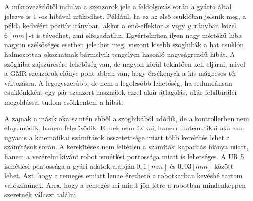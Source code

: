 A mikrovezérlőtől indulva a szenzorok jele a feldolgozás során a gyártó által jelezve is $1^\circ$-os hibával működhet. Például, ha ez az első csuklóban jelenik meg, a példa kedvéért pozitív irányban, akkor a end-effektor $x$ vagy $y$ irányban közel $6[mm]$-t is tévedhet, ami elfogadatlan. Egyértelműen ilyen nagy mértékű hiba nagyon szélsőséges esetben jelenhet meg, viszont kisebb szöghibák a hat csuklón halmozottan okozhatnak bármelyik tengelyen hasonló nagyságrendű hibát. A szöghiba zajszűrésére lehetőség van, de nagyon körül tekintően kell eljárni, mivel a GMR szenzorok előnye pont abban van, hogy érzékenyek a kis mágneses tér változásra. A legegyszerűbb, de nem a legolcsóbb lehetőség, ha redundánsan csuklónkként egy pár szenzort használok ezzel akár átlagolás, akár felülbírálói megoldással tudom csökkenteni a hibát.

A zajnak a másik oka szintén ebből a szöghibából adódik, de a kontrollerben nem elnyomódik, hanem felerősödik. Ennek nem fizikai, hanem matematikai oka van, ugyanis a kinematikai számítások összetettsége miatt több kerekítés lehet a számítások során. A kerekítések nem feltétlen a számítási kapacitás hiánya miatt, hanem a vezérelni kívánt robot ismétlési pontossága miatt is lehetséges. A UR 5 ismétlési pontossága a gyári adatok alapján $0,1[mm]$ és $0,03[mm]$ között lehet. Azt, hogy a remegés emiatt lenne érezhető a robotkarban kevésbé tartom valószínűnek. Arra, hogy a remegés mi miatt jön létre a robotban mindenképpen szeretnék választ találni.
